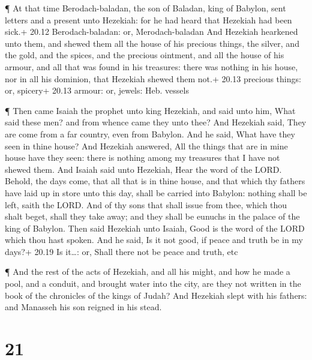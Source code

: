 ¶ At that time Berodach-baladan, the son of Baladan, king
of Babylon, sent letters and a present unto Hezekiah: for he had heard
that Hezekiah had been sick.+ 20.12 Berodach-baladan: or,
Merodach-baladan  And Hezekiah hearkened unto them, and
shewed them all the house of his precious things, the silver, and the
gold, and the spices, and the precious ointment, and all the house of
his armour, and all that was found in his treasures: there was nothing
in his house, nor in all his dominion, that Hezekiah shewed them not.+
20.13 precious things: or, spicery+ 20.13 armour: or, jewels: Heb.
vessels

 ¶ Then came Isaiah the prophet unto king Hezekiah, and
said unto him, What said these men? and from whence came they unto thee?
And Hezekiah said, They are come from a far country, even from Babylon.
 And he said, What have they seen in thine house? And
Hezekiah answered, All the things that are in mine house have they seen:
there is nothing among my treasures that I have not shewed them.
 And Isaiah said unto Hezekiah, Hear the word of the LORD.
 Behold, the days come, that all that is in thine house,
and that which thy fathers have laid up in store unto this day, shall be
carried into Babylon: nothing shall be left, saith the LORD.
 And of thy sons that shall issue from thee, which thou
shalt beget, shall they take away; and they shall be eunuchs in the
palace of the king of Babylon.  Then said Hezekiah unto
Isaiah, Good is the word of the LORD which thou hast spoken. And he
said, Is it not good, if peace and truth be in my days?+ 20.19 Is
it\ldots: or, Shall there not be peace and truth, etc

 ¶ And the rest of the acts of Hezekiah, and all his might,
and how he made a pool, and a conduit, and brought water into the city,
are they not written in the book of the chronicles of the kings of
Judah?  And Hezekiah slept with his fathers: and Manasseh
his son reigned in his stead.

\hypertarget{section-20}{%
\section{21}\label{section-20}}

